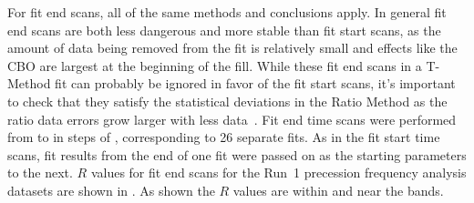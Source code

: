 

For fit end scans, all of the same methods and conclusions apply. In general fit end scans are both less dangerous and more stable than fit start scans, as the amount of data being removed from the fit is relatively small and effects like the CBO are largest at the beginning of the fill. While these fit end scans in a T-Method fit can probably be ignored in favor of the fit start scans, it's important to check that they satisfy the statistical deviations in the Ratio Method as the ratio data errors grow larger with less data~\cite{BU60hReport}. Fit end time scans were performed from  to  in steps of , corresponding to 26 separate fits. As in the fit start time scans, fit results from the end of one fit were passed on as the starting parameters to the next. $R$ values for fit end scans for the Run~1 precession frequency analysis datasets are shown in . As shown the $R$ values are within and near the bands.


